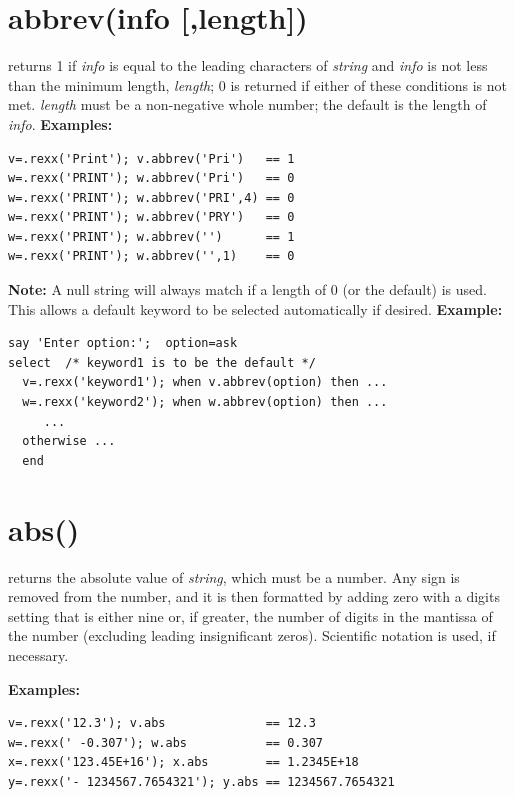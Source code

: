 \section{abbrev(info [,length{]})}\label{refabbrev}
returns 1 if \emph{info} is equal to the leading characters of
\emph{string} and \emph{info} is not less than
the minimum length, \emph{length}; 0 is returned
if either of these conditions is not met.
\emph{length} must be a non-negative whole number; the default is
the length of \emph{info}.
 \textbf{Examples:}
\begin{lstlisting}
v=.rexx('Print'); v.abbrev('Pri')   == 1
w=.rexx('PRINT'); w.abbrev('Pri')   == 0
w=.rexx('PRINT'); w.abbrev('PRI',4) == 0
w=.rexx('PRINT'); w.abbrev('PRY')   == 0
w=.rexx('PRINT'); w.abbrev('')      == 1
w=.rexx('PRINT'); w.abbrev('',1)    == 0
\end{lstlisting}
\textbf{Note: }A null string will always match if a length of 0 (or the default)
is used.
This allows a default keyword to be selected automatically if desired.
 \textbf{Example:}
\begin{lstlisting}
say 'Enter option:';  option=ask
select  /* keyword1 is to be the default */
  v=.rexx('keyword1'); when v.abbrev(option) then ...
  w=.rexx('keyword2'); when w.abbrev(option) then ...
     ...
  otherwise ...
  end
\end{lstlisting}
\section{abs()}\label{refabs}
returns the absolute value of \emph{string}, which must be a
number.
 Any sign is removed from the number, and it is then formatted by adding
zero with a digits setting that is either nine or, if greater, the
number of digits in the mantissa of the number (excluding leading
insignificant zeros).
Scientific notation is used, if necessary.
 
\textbf{Examples:}
\begin{lstlisting}
v=.rexx('12.3'); v.abs              == 12.3
w=.rexx(' -0.307'); w.abs           == 0.307
x=.rexx('123.45E+16'); x.abs        == 1.2345E+18
y=.rexx('- 1234567.7654321'); y.abs == 1234567.7654321
\end{lstlisting}

